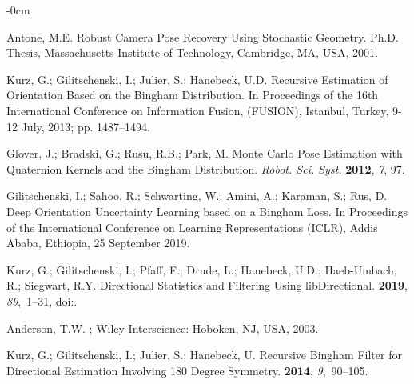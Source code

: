 \documentclass[micromachines,article,accept,pdftex,moreauthors]{Definitions/mdpi}
\begin{document}
\begin{adjustwidth}{-\extralength}{0cm}
\begin{thebibliography}{999}
Antone, M.E.
\newblock Robust {{Camera Pose Recovery Using Stochastic Geometry}}.
\newblock Ph.D. Thesis,  {Massachusetts Institute of Technology, Cambridge, MA, USA, 2001.} %

Kurz, G.; Gilitschenski, I.; Julier, S.; Hanebeck, U.D.
\newblock Recursive Estimation of Orientation Based on the {{Bingham}} Distribution.
\newblock In Proceedings of the  16th International Conference on Information Fusion, {(FUSION), Istanbul, Turkey, 9-12 July, 2013;}  pp. 1487--1494.

Glover, J.; Bradski, G.; Rusu, R.B.; Park, M.
\newblock Monte {{Carlo Pose Estimation}} with {{Quaternion Kernels}} and the {{Bingham Distribution}}.
\newblock  \emph{Robot. Sci. Syst.}  \textbf{2012}, \emph{7}, 97.

Gilitschenski, I.; Sahoo, R.; Schwarting, W.; Amini, A.; Karaman, S.; Rus, D.
\newblock Deep Orientation Uncertainty Learning based on a Bingham Loss.
\newblock In Proceedings of the  International Conference on Learning {Representations (ICLR), Addis Ababa, Ethiopia, 25 September 2019}.

Kurz, G.; Gilitschenski, I.; Pfaff, F.; Drude, L.; Hanebeck, U.D.; Haeb-Umbach, R.; Siegwart, R.Y.
\newblock Directional {{Statistics}} and {{Filtering Using libDirectional}}.
 {\bf 2019}, {\em  89},~1--31,
\newblock
doi:{\href{https://doi.org/10.18637/jss.v089.i04}{}}.

Anderson, T.W.
; {Wiley-Interscience}: Hoboken, NJ, USA,  2003.

Kurz, G.; Gilitschenski, I.; Julier, S.; Hanebeck, U.
\newblock Recursive {{Bingham Filter}} for {{Directional Estimation Involving}} 180 {{Degree Symmetry}}.
 {\bf 2014}, {\em 9},~90--105.

\end{thebibliography}

\end{adjustwidth}
\end{document}
